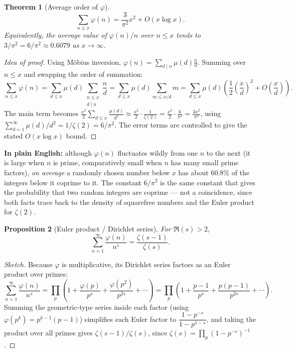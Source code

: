 \documentclass[11pt]{article}
\newtheorem{theorem}{Theorem}[section]
\newtheorem{proposition}[theorem]{Proposition}
\theoremstyle{definition}
\theoremstyle{remark}
\begin{document}
\begin{theorem}[Average order of $\varphi$]
\[
\sum_{n \le x} \varphi(n) = \frac{3}{\pi^2}x^2 + O(x\log x).
\]
Equivalently, the \emph{average} value of $\varphi(n)/n$ over $n \le x$ tends to $3/\pi^2 = 6/\pi^2 \approx 0.6079$ as $x\to\infty$.
\end{theorem}

\begin{proof}[Idea of proof]
Using Möbius inversion, $\varphi(n) = \sum_{d\mid n}\mu(d)\frac{n}{d}$. Summing over $n \le x$ and swapping the order of summation:
\[
\sum_{n\le x}\varphi(n) = \sum_{d\le x}\mu(d)\sum_{\substack{n\le x \\ d\mid n}} \frac{n}{d} = \sum_{d\le x}\mu(d) \sum_{m \le x/d} m = \sum_{d \le x}\mu(d)\left(\frac{1}{2}\left(\frac{x}{d}\right)^2 + O\!\left(\frac{x}{d}\right)\right).
\]
The main term becomes $\tfrac{x^2}{2}\sum_{d\le x}\frac{\mu(d)}{d^2} \approx \tfrac{x^2}{2}\cdot\frac{1}{\zeta(2)} = \tfrac{x^2}{2}\cdot\frac{6}{\pi^2} = \frac{3x^2}{\pi^2}$, using $\sum_{d=1}^\infty \mu(d)/d^2 = 1/\zeta(2) = 6/\pi^2$. The error terms are controlled to give the stated $O(x\log x)$ bound.
\end{proof}

\noindent\textbf{In plain English:} although $\varphi(n)$ fluctuates wildly from one $n$ to the next (it is large when $n$ is prime, comparatively small when $n$ has many small prime factors), \emph{on average} a randomly chosen number below $x$ has about $60.8\%$ of the integers below it coprime to it. The constant $6/\pi^2$ is the same constant that gives the probability that two random integers are coprime — not a coincidence, since both facts trace back to the density of squarefree numbers and the Euler product for $\zeta(2)$.

\begin{proposition}[Euler product / Dirichlet series]
For $\Re(s) > 2$,
\[
\sum_{n=1}^\infty \frac{\varphi(n)}{n^s} = \frac{\zeta(s-1)}{\zeta(s)}.
\]
\end{proposition}

\begin{proof}[Sketch]
Because $\varphi$ is multiplicative, its Dirichlet series factors as an Euler product over primes:
\[
\sum_{n=1}^\infty \frac{\varphi(n)}{n^s} = \prod_p \left(1 + \frac{\varphi(p)}{p^s} + \frac{\varphi(p^2)}{p^{2s}} + \cdots\right) = \prod_p\left(1 + \frac{p-1}{p^s} + \frac{p(p-1)}{p^{2s}}+\cdots\right).
\]
Summing the geometric-type series inside each factor (using $\varphi(p^k)=p^{k-1}(p-1)$) simplifies each Euler factor to $\dfrac{1-p^{-s}}{1-p^{1-s}}$, and taking the product over all primes gives $\zeta(s-1)/\zeta(s)$, since $\zeta(s) = \prod_p (1-p^{-s})^{-1}$.
\end{proof}
\end{document}
